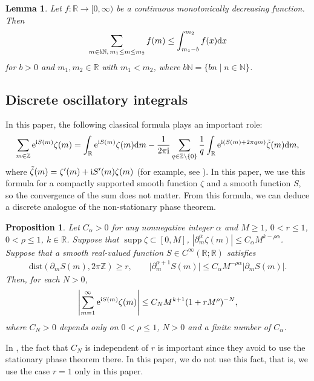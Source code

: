 \documentclass[10pt,a4paper]{amsart}
\numberwithin{equation}{section}
\newtheorem{Lemma}[Theorem]{Lemma}
\newtheorem{Proposition}[Theorem]{Proposition}
 { \theoremstyle{definition}
\newtheorem{Definition}[Theorem]{Definition}
\newtheorem{Note}[Theorem]{Note}
\newtheorem{Example}[Theorem]{Example}
\newtheorem{Remark}[Theorem]{Remark} }
\def\R{\mathbb{R}}%
\DeclareMathOperator{\supp}{supp}%
\def\a{\alpha}
\def\z{\zeta}
\def\pa{\partial}
\begin{document}
\begin{Lemma}\label{monotonesum}
Let $f\colon\R\to [0,\infty)$ be a continuous monotonically decreasing function. Then
\begin{align*}
\sum_{m\in b\mathbb{N},\, m_1\leq m\leq m_2}f(m)\leq \int_{m_1-b}^{m_2}f(x){\rm d}x
\end{align*}
for $b>0$ and $m_1,m_2\in \mathbb{R}$ with $m_1<m_2$, where $b\mathbb{N}=\{b n\mid n\in \mathbb{N}\}$.
\end{Lemma}

\subsection{Discrete oscillatory integrals}

In this paper, the following classical formula plays an important role:
\begin{align}\label{discon}
\sum_{m\in\mathbb{Z}}{\rm e}^{{\rm i}S(m)}\z(m)=\int_{\R}{\rm e}^{{\rm i}S(m)}\z(m){\rm d}m-\frac{1}{2\pi {\rm i}}\sum_{q\in\mathbb{Z}\setminus \{0\}}\frac{1}{q}\int_{\R}{\rm e}^{{\rm i}(S(m)+2\pi qm)}\tilde{\z}(m) {\rm d}m,
\end{align}
where $\tilde{\z}(m)=\z'(m)+{\rm i}S'(m)\z(m)$ (for example, see \cite[Proof of Lemma 5.3]{IJ}). In this paper, we use this formula for a compactly supported smooth function $\z$ and a smooth function $S$, so the convergence of the sum does not matter.
 From this formula, we can deduce a discrete analogue of the non-stationary phase theorem.

\begin{Proposition}\label{discsum1}
Let $C_{\a}>0$ for any nonnegative integer $\a$ and $M\geq 1$, $0<r\leq 1$, $0<\rho\leq 1$, $k\in \R$.
Suppose that
$
\supp \z\subset [0,M]$, $ |\pa_m^{\a}\z(m)|\leq C_{\a}M^{k-\rho\a}$.
Suppose that a smooth real-valued function $S\in C^{\infty}(\R;\R)$ satisfies
\begin{align*}
\mathrm{dist}(\pa_mS(m), 2\pi\mathbb{Z})\geq r,\qquad \big|\pa_m^{\a+1}S(m)\big|\leq C_{\a}M^{-\rho\a}|\pa_mS(m)|.
\end{align*}
Then, for each $N>0$,
\begin{align*}
\left|\sum_{m=1}^{\infty}{\rm e}^{{\rm i}S(m)}\z(m)\right|\leq C_NM^{k+1}(1+r M^{\rho})^{-N},
\end{align*}
where $C_N>0$ depends only on $0<\rho\leq 1$, $N>0$ and a finite number of $C_{\a}$.
\end{Proposition}

\begin{Remark}
In \cite{IJ}, the fact that $C_N$ is independent of $r$ is important since they avoid to use the stationary phase theorem there. In this paper, we do not use this fact, that is, we use the case $r=1$ only in this paper.
\end{Remark}
\end{document}
